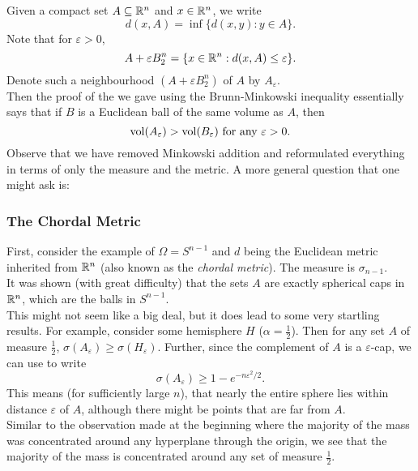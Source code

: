 Given a compact set $A\subseteq\mathbb{R}^n$ and $x\in\mathbb{R}^n$, we write
\[ d(x,A) = \inf\{d(x,y):y\in A\}. \]
Note that for $\varepsilon>0$,
\[ A + \varepsilon B_2^n = \{x\in\mathbb{R}^n:d(x,A)\leq\varepsilon\}. \]
Denote such a neighbourhood $(A+\varepsilon B_2^n)$ of $A$ by $A_\varepsilon$.\\
Then the proof of the  we gave using the Brunn-Minkowski inequality essentially says that if $B$ is a Euclidean ball of the same volume as $A$, then
\[ \operatorname{vol}(A_\varepsilon) > \operatorname{vol}(B_\varepsilon) \text{ for any }\varepsilon>0. \]
Observe that we have removed Minkowski addition and reformulated everything in terms of only the measure and the metric. A more general question that one might ask is:

\subsubsection{The Chordal Metric}
\label{3.1.1 the chordal metric}

First, consider the example of $\Omega=S^{n-1}$ and $d$ being the Euclidean metric inherited from $\mathbb{R}^n$ (also known as the \textit{chordal metric}). The measure is $\sigma_{n-1}$.\\
It was shown (with great difficulty) that the sets $A$ are exactly spherical caps in $\mathbb{R}^n$, which are the balls in $S^{n-1}$.\\

This might not seem like a big deal, but it does lead to some very startling results. For example, consider some hemisphere $H$ ($\alpha=\frac{1}{2}$). Then for any set $A$ of measure $\frac{1}{2}$, $\sigma(A_\varepsilon) \geq \sigma(H_\varepsilon)$. Further, since the complement of $A$ is a $\varepsilon$-cap, we can use  to write
\[ \sigma(A_\varepsilon) \geq 1 - e^{-n\varepsilon^2/2}. \]
This means (for sufficiently large $n$), that nearly the entire sphere lies within distance $\varepsilon$ of $A$, although there might be points that are far from $A$.\\
Similar to the observation made at the beginning where the majority of the mass was concentrated around any hyperplane through the origin, we see that the majority of the mass is concentrated around any set of measure $\frac{1}{2}$.\\

